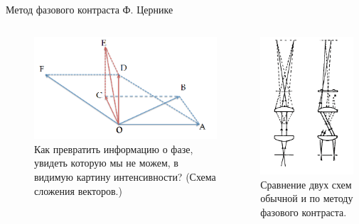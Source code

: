 \documentclass[9pt, compress, xcolor=table]{beamer}
\begin{document}
\begin{frame}{Метод фазового контраста Ф. Цернике}
\begin{columns}[c]
\column{8cm}
\begin{center}
\begin{figure}
\centering
\includegraphics[width=0.9 \textwidth]{phc1}
\\Как  превратить информацию о фазе, увидеть которую мы не можем, в видимую картину интенсивности? (Схема сложения векторов.)
\end{figure}
\end{center}
 
 \column{5cm}
\begin{center}
\includegraphics[width=0.9\textwidth]{phc0}
\\{\scriptsize Сравнение двух схем обычной и по методу фазового контраста.}
\end{center}
\end{columns}
\end{frame}
\end{document}
